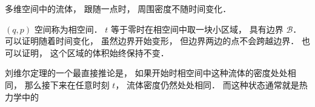 
多维空间中的流体， 跟随一点时， 周围密度不随时间变化．

$(q, p)$ 空间称为相空间． $t$ 等于零时在相空间中取一块小区域， 具有边界 $\mathcal B$． 可以证明随着时间变化， 虽然边界开始变形， 但边界两边的点不会跨越边界． 也可以证明， 这个区域的体积始终保持不变．

刘维尔定理的一个最直接推论是， 如果开始时相空间中这种流体的密度处处相同， 那么接下来在任意时刻 $t$， 流体密度仍然处处相同． 而这种状态通常就是热力学中的
